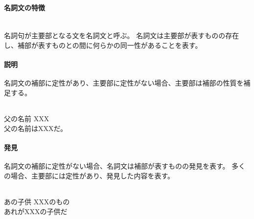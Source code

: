 \paragraph{名詞文の特徴}\quad\\
名詞句が主要部となる文を名詞文と呼ぶ。
名詞文は主要部が表すものの存在し、補部が表すものとの間に何らかの同一性があることを表す。

\paragraph{説明}
名詞文の補部に定性があり、主要部に定性がない場合、主要部は補部の性質を補足する。

\begin{exe}
    \ex \gll [u\'ak\'a ap\'a piku\'o] [XXX] \\
        父の名前 XXX \\
    \glt 父の名前はXXXだ。
\end{exe}

\paragraph{発見}
名詞文の補部に定性がない場合、名詞文は補部が表すものの発見を表す。
多くの場合、主要部には定性があり、発見した内容を表す。

\begin{exe}
    \ex \gll [r\'i\'i mipop\'a] [XXX k\'a\'a] \\
        あの子供 XXXのもの \\
    \glt あれがXXXの子供だ
\end{exe}